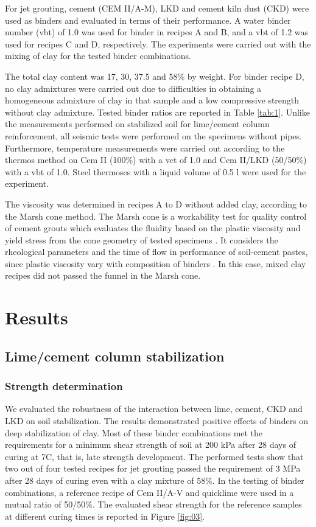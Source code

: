 \documentclass[USenglish,twocolumn]{article}
\begin{document}
For jet grouting, cement (CEM II/A-M), LKD and cement kiln dust (CKD) were used as binders and evaluated in terms of their performance. A water binder number (vbt) of 1.0 was used for binder in recipes A and B, and a vbt of 1.2 was used for recipes C and D, respectively. The experiments were carried out with the mixing of clay for the tested binder combinations. 

The total clay content was 17, 30, 37.5 and 58\% by weight. For binder recipe D, no clay admixtures were carried out due to difficulties in obtaining a homogeneous admixture of clay in that sample and a low compressive strength without clay admixture. Tested binder ratios are reported in Table \ref{tab:1}. Unlike the measurements performed on stabilized soil for lime/cement column reinforcement, all seismic tests were performed on the specimens without pipes. Furthermore, temperature measurements were carried out according to the thermos method on Cem II (100\%) with a vct of 1.0 and Cem II/LKD (50/50\%) with a vbt of 1.0. Steel thermoses with a liquid volume of 0.5 l were used for the experiment.

The viscosity was determined in recipes A to D without added clay, according to the Marsh cone method. The Marsh cone is a workability test for quality control of cement grouts which evaluates the fluidity based on the plastic viscosity and yield stress from the cone geometry of tested specimens \cite{ROUSSEL2005823}. It considers the rheological parameters and the time of flow in performance of soil-cement pastes, since plastic viscosity vary with composition of binders \cite{Banfill,FERRARIS2001245}. In this case, mixed clay recipes did not passed the funnel in the Marsh cone. 

\section{Results}

\subsection{Lime/cement column stabilization}
\subsubsection{Strength determination}
We evaluated the robustness of the interaction between lime, cement, CKD and LKD on soil stabilization. The results demonstrated positive effects of binders on deep stabilization of clay. Most of these binder combinations met the requirements for a minimum shear strength of soil at 200 kPa after 28 days of curing at 7\degree C, that is, late strength development. The performed tests show that two out of four tested recipes for jet grouting passed the requirement of 3 MPa after 28 days of curing even with a clay mixture of 58\%. In the testing of binder combinations, a reference recipe of Cem II/A-V and quicklime were used in a mutual ratio of 50/50\%. The evaluated shear strength for the reference samples at different curing times is reported in Figure \ref{fig:03}.
\end{document}
